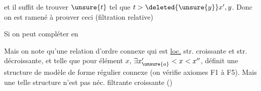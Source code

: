 

et il suffit de trouver $\unsure{t}$ tel que $t>\deleted{\unsure{y}}x',y$. Donc on est ramené à prouver ceci (filtration relative)

Si
on peut compléter en


Mais on note qu'une relation d'ordre connexe qui est \uline{loc.} str. croissante et str. décroissante, et telle que pour  élément $x$, $\exists x'_{\unsure{a}}<x<x''$, définit une structure de modèle de forme régulier connexe (on vérifie axiomes F1 à F5). Mais une telle structure n'est pas néc. filtrante croissante ()


